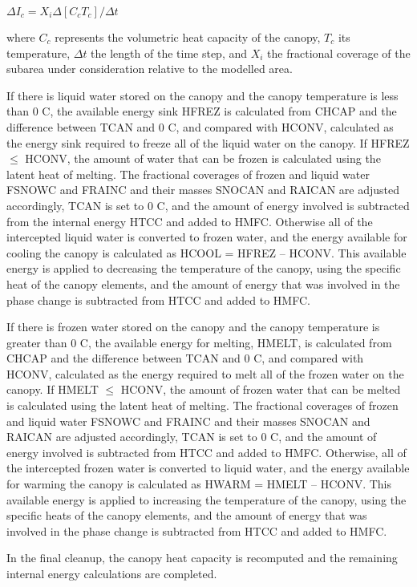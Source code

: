 $\Delta I_c = X_i \Delta [C_c T_c ] / \Delta t$

where $C_c$ represents the volumetric heat capacity of the canopy, $T_c$ its temperature, $\Delta t$ the length of the time step, and $X_i$ the fractional coverage of the subarea under consideration relative to the modelled area.

If there is liquid water stored on the canopy and the canopy temperature is less than 0 C, the available energy sink H\+F\+R\+E\+Z is calculated from C\+H\+C\+A\+P and the difference between T\+C\+A\+N and 0 C, and compared with H\+C\+O\+N\+V, calculated as the energy sink required to freeze all of the liquid water on the canopy. If H\+F\+R\+E\+Z $\leq$ H\+C\+O\+N\+V, the amount of water that can be frozen is calculated using the latent heat of melting. The fractional coverages of frozen and liquid water F\+S\+N\+O\+W\+C and F\+R\+A\+I\+N\+C and their masses S\+N\+O\+C\+A\+N and R\+A\+I\+C\+A\+N are adjusted accordingly, T\+C\+A\+N is set to 0 C, and the amount of energy involved is subtracted from the internal energy H\+T\+C\+C and added to H\+M\+F\+C. Otherwise all of the intercepted liquid water is converted to frozen water, and the energy available for cooling the canopy is calculated as H\+C\+O\+O\+L = H\+F\+R\+E\+Z – H\+C\+O\+N\+V. This available energy is applied to decreasing the temperature of the canopy, using the specific heat of the canopy elements, and the amount of energy that was involved in the phase change is subtracted from H\+T\+C\+C and added to H\+M\+F\+C.

If there is frozen water stored on the canopy and the canopy temperature is greater than 0 C, the available energy for melting, H\+M\+E\+L\+T, is calculated from C\+H\+C\+A\+P and the difference between T\+C\+A\+N and 0 C, and compared with H\+C\+O\+N\+V, calculated as the energy required to melt all of the frozen water on the canopy. If H\+M\+E\+L\+T $\leq$ H\+C\+O\+N\+V, the amount of frozen water that can be melted is calculated using the latent heat of melting. The fractional coverages of frozen and liquid water F\+S\+N\+O\+W\+C and F\+R\+A\+I\+N\+C and their masses S\+N\+O\+C\+A\+N and R\+A\+I\+C\+A\+N are adjusted accordingly, T\+C\+A\+N is set to 0 C, and the amount of energy involved is subtracted from H\+T\+C\+C and added to H\+M\+F\+C. Otherwise, all of the intercepted frozen water is converted to liquid water, and the energy available for warming the canopy is calculated as H\+W\+A\+R\+M = H\+M\+E\+L\+T – H\+C\+O\+N\+V. This available energy is applied to increasing the temperature of the canopy, using the specific heats of the canopy elements, and the amount of energy that was involved in the phase change is subtracted from H\+T\+C\+C and added to H\+M\+F\+C.

In the final cleanup, the canopy heat capacity is recomputed and the remaining internal energy calculations are completed.